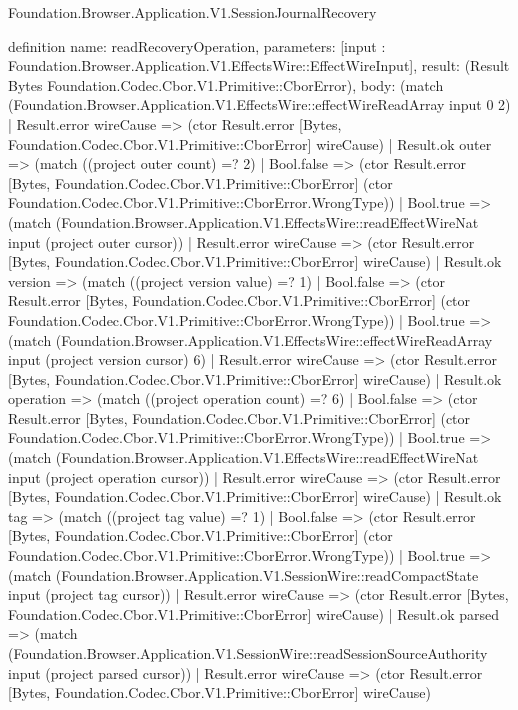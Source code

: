\begin{lexlean}{Foundation.Browser.Application.V1.SessionJournalRecovery}
\begin{semanticmodule}
definition{
  name: readRecoveryOperation,
  parameters: [input : Foundation.Browser.Application.V1.EffectsWire::EffectWireInput],
  result: (Result Bytes Foundation.Codec.Cbor.V1.Primitive::CborError),
  body: (match (Foundation.Browser.Application.V1.EffectsWire::effectWireReadArray input 0 2)
    | Result.error wireCause => (ctor Result.error [Bytes, Foundation.Codec.Cbor.V1.Primitive::CborError] wireCause)
    | Result.ok outer => (match ((project outer count) =? 2)
      | Bool.false => (ctor Result.error [Bytes, Foundation.Codec.Cbor.V1.Primitive::CborError] (ctor Foundation.Codec.Cbor.V1.Primitive::CborError.WrongType))
      | Bool.true => (match (Foundation.Browser.Application.V1.EffectsWire::readEffectWireNat input (project outer cursor))
        | Result.error wireCause => (ctor Result.error [Bytes, Foundation.Codec.Cbor.V1.Primitive::CborError] wireCause)
        | Result.ok version => (match ((project version value) =? 1)
          | Bool.false => (ctor Result.error [Bytes, Foundation.Codec.Cbor.V1.Primitive::CborError] (ctor Foundation.Codec.Cbor.V1.Primitive::CborError.WrongType))
          | Bool.true => (match (Foundation.Browser.Application.V1.EffectsWire::effectWireReadArray input (project version cursor) 6)
            | Result.error wireCause => (ctor Result.error [Bytes, Foundation.Codec.Cbor.V1.Primitive::CborError] wireCause)
            | Result.ok operation => (match ((project operation count) =? 6)
              | Bool.false => (ctor Result.error [Bytes, Foundation.Codec.Cbor.V1.Primitive::CborError] (ctor Foundation.Codec.Cbor.V1.Primitive::CborError.WrongType))
              | Bool.true => (match (Foundation.Browser.Application.V1.EffectsWire::readEffectWireNat input (project operation cursor))
                | Result.error wireCause => (ctor Result.error [Bytes, Foundation.Codec.Cbor.V1.Primitive::CborError] wireCause)
                | Result.ok tag => (match ((project tag value) =? 1)
                  | Bool.false => (ctor Result.error [Bytes, Foundation.Codec.Cbor.V1.Primitive::CborError] (ctor Foundation.Codec.Cbor.V1.Primitive::CborError.WrongType))
                  | Bool.true => (match (Foundation.Browser.Application.V1.SessionWire::readCompactState input (project tag cursor))
                    | Result.error wireCause => (ctor Result.error [Bytes, Foundation.Codec.Cbor.V1.Primitive::CborError] wireCause)
                    | Result.ok parsed => (match (Foundation.Browser.Application.V1.SessionWire::readSessionSourceAuthority input (project parsed cursor))
                      | Result.error wireCause => (ctor Result.error [Bytes, Foundation.Codec.Cbor.V1.Primitive::CborError] wireCause)
}
\end{semanticmodule}
\end{lexlean}
